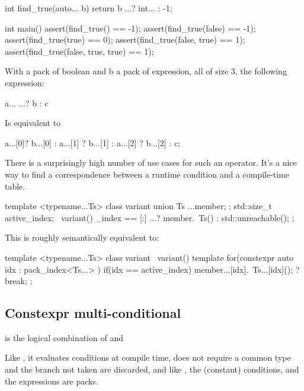 \documentclass{wg21}
\begin{document}
\begin{colorblock}
int find_true(auto... b) {
    return b ...? int... : -1;
}

int main() {
    assert(find_true() == -1);
    assert(find_true(false) == -1);
    assert(find_true(true) == 0);
    assert(find_true(false, true) == 1);
    assert(find_true(false, true, true) == 1);
}
\end{colorblock}

With a pack of boolean and b a pack of expression, all of size 3, the following expression:

\begin{colorblock}
a... ...? b : c
\end{colorblock}

Is equivalent to

\begin{colorblock}
a...[0]? b...[0] : a...[1] ? b...[1] : a...[2] ? b...[2] : c;
\end{colorblock}


There is a surprisingly high number of use cases for such an operator.
It's a nice way to find a correspondence between a runtime condition and a compile-time table.

\begin{colorblock}
template <typename...Ts>
class variant {
    union {
        Ts ...member;
    };
    std::size_t active_index;
    ~variant() {
        _index == [:] ...? member.~Ts() : std::unreachable();
    }
};
\end{colorblock}

This is roughly semantically equivalent to:

\begin{colorblock}
template <typename...Ts>
class variant {
    ~variant() {
        template for(constexpr auto idx : pack_index<Ts...> )  {
            if(idx == active_index) {
                member...[idx].~Ts...[idx](); ?
                break;
            }
        }
    }
};
\end{colorblock}

\subsection{Constexpr multi-conditional }

 is the logical combination of  and 

Like  , it evaluates conditions at compile time, does not require a common type and the branch not taken are discarded,
and like , the (constant) conditions, and the expressions are packs.
\end{document}
